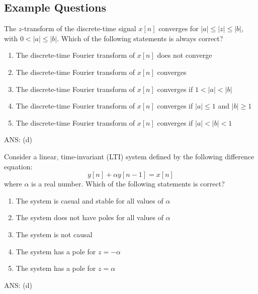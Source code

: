 \subsection{Example Questions}
\begin{q}{}
The $z$-transform of the discrete-time signal $x[n]$ converges for $\lvert a \rvert \leq \lvert z \rvert \leq \lvert b \rvert$, with $0 < \lvert a \rvert \leq \lvert b \rvert$. Which of the following statements is always correct?

\begin{enumerate}[label=(\alph*)]
    \item The discrete-time Fourier transform of $x[n]$ does not converge
    \item The discrete-time Fourier transform of $x[n]$ converges
    \item The discrete-time Fourier transform of $x[n]$ converges if $1 < \lvert a \rvert < \lvert b \rvert$
    \item The discrete-time Fourier transform of $x[n]$ converges if $\lvert a \rvert \leq 1$ and $\lvert b \rvert \geq 1$
    \item The discrete-time Fourier transform of $x[n]$ converges if $\lvert a \rvert < \lvert b \rvert < 1$
\end{enumerate}
\begin{flushright}
\begin{blueenv}
    ANS: (d)
\end{blueenv}
\end{flushright}
\end{q}
\begin{q}{}
Consider a linear, time-invariant (LTI) system defined by the following difference equation:
\[
    y[n] + \alpha y[n-1] = x[n]
\]
where $\alpha$ is a real number. Which of the following statements is correct?

\begin{enumerate}[label=(\alph*)]
    \item The system is casual and stable for all values of $\alpha$
    \item The system does not have poles for all values of $\alpha$
    \item The system is not causal
    \item The system has a pole for $z=-\alpha$
    \item The system has a pole for $z=\alpha$
\end{enumerate}
\begin{flushright}
\begin{blueenv}
    ANS: (d)
\end{blueenv}
\end{flushright}
\end{q}
